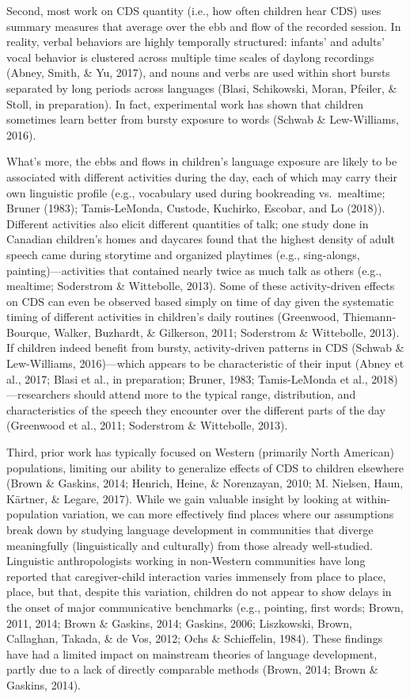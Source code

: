 \documentclass[floatsintext,man]{apa6}
\theoremstyle{definition}
\theoremstyle{definition}
\theoremstyle{definition}
\theoremstyle{remark}
\begin{document}
Second, most work on CDS quantity (i.e., how often children hear CDS)
uses summary measures that average over the ebb and flow of the recorded
session. In reality, verbal behaviors are highly temporally structured:
infants' and adults' vocal behavior is clustered across multiple time
scales of daylong recordings (Abney, Smith, \& Yu, 2017), and nouns and
verbs are used within short bursts separated by long periods across
languages (Blasi, Schikowski, Moran, Pfeiler, \& Stoll, in preparation).
In fact, experimental work has shown that children sometimes learn
better from bursty exposure to words (Schwab \& Lew-Williams, 2016).

What's more, the ebbs and flows in children's language exposure are
likely to be associated with different activities during the day, each
of which may carry their own linguistic profile (e.g., vocabulary used
during bookreading vs.~mealtime; Bruner (1983); Tamis-LeMonda, Custode,
Kuchirko, Escobar, and Lo (2018)). Different activities also elicit
different quantities of talk; one study done in Canadian children's
homes and daycares found that the highest density of adult speech came
during storytime and organized playtimes (e.g., sing-alongs,
painting)---activities that contained nearly twice as much talk as
others (e.g., mealtime; Soderstrom \& Wittebolle, 2013). Some of these
activity-driven effects on CDS can even be observed based simply on time
of day given the systematic timing of different activities in children's
daily routines (Greenwood, Thiemann-Bourque, Walker, Buzhardt, \&
Gilkerson, 2011; Soderstrom \& Wittebolle, 2013). If children indeed
benefit from bursty, activity-driven patterns in CDS (Schwab \&
Lew-Williams, 2016)---which appears to be characteristic of their input
(Abney et al., 2017; Blasi et al., in preparation; Bruner, 1983;
Tamis-LeMonda et al., 2018)---researchers should attend more to the
typical range, distribution, and characteristics of the speech they
encounter over the different parts of the day (Greenwood et al., 2011;
Soderstrom \& Wittebolle, 2013).

Third, prior work has typically focused on Western (primarily North
American) populations, limiting our ability to generalize effects of CDS
to children elsewhere (Brown \& Gaskins, 2014; Henrich, Heine, \&
Norenzayan, 2010; M. Nielsen, Haun, Kärtner, \& Legare, 2017). While we
gain valuable insight by looking at within-population variation, we can
more effectively find places where our assumptions break down by
studying language development in communities that diverge meaningfully
(linguistically and culturally) from those already well-studied.
Linguistic anthropologists working in non-Western communities have long
reported that caregiver-child interaction varies immensely from place to
place, place, but that, despite this variation, children do not appear
to show delays in the onset of major communicative benchmarks (e.g.,
pointing, first words; Brown, 2011, 2014; Brown \& Gaskins, 2014;
Gaskins, 2006; Liszkowski, Brown, Callaghan, Takada, \& de Vos, 2012;
Ochs \& Schieffelin, 1984). These findings have had a limited impact on
mainstream theories of language development, partly due to a lack of
directly comparable methods (Brown, 2014; Brown \& Gaskins, 2014).
\end{document}

